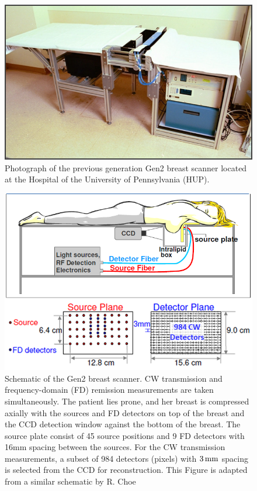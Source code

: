 \begin{figure}[t]
\centering
\includegraphics[width=12cm]{./figures/4_Gen3/gen2pic.png}
\caption[Photograph of the previous generation Gen2 breast scanner]{Photograph of the previous generation Gen2 breast scanner located at the Hospital of the University of Pennsylvania (HUP).}
\label{fig:gen2pic}
\end{figure}
\begin{figure}[ht]
\centering
\includegraphics[width=12cm]{./figures/4_Gen3/gen2schem.png}
\caption[Schematic of the Gen2 breast scanner]{Schematic of the Gen2 breast scanner. CW transmission and frequency-domain (FD) remission measurements are taken simultaneously. The patient lies prone, and her breast is compressed axially with the sources and FD detectors on top of the breast and the CCD detection window against the bottom of the breast. The source plate consist of 45 source positions and 9 FD detectors with 16mm spacing between the sources. For the CW transmission measurements, a subset of 984 detectors (pixels) with $3\,{\rm mm}$ spacing is selected from the CCD for reconstruction. This Figure is adapted from a similar schematic by R. Choe \cite{Choe2005}}
\label{fig:gen2schem}
\end{figure}

